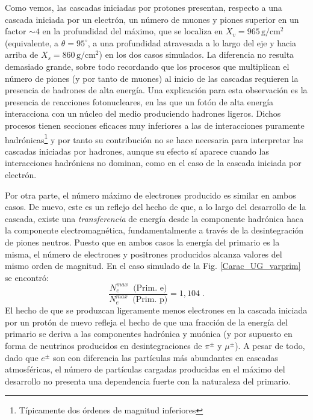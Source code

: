 \documentclass[11 pt, a4paper]{article} %
\numberwithin{equation}{section}
\numberwithin{figure}{section}
\numberwithin{table}{section}
\begin{document}
Como vemos, las cascadas iniciadas por protones presentan, respecto a una cascada iniciada por un electrón, un número de muones y piones superior en un factor $\sim 4$ en la profundidad del máximo, que se localiza en $X_v=965\,\mathrm{g/cm^2}$ (equivalente, a $\theta=95^\circ$, a una profundidad atravesada a lo largo del eje y hacia arriba de $X_s=860\,\mathrm{g/cm^2}$) en los dos casos simulados. La diferencia no resulta demasiado grande, sobre todo recordando que los procesos que multiplican el número de piones (y por tanto de muones) al inicio de las cascadas requieren la presencia de hadrones de alta energía. Una explicación para esta observación es la presencia de reacciones fotonucleares, en las que un fotón de alta energía interacciona con un núcleo del medio produciendo hadrones ligeros. Dichos procesos tienen secciones eficaces muy inferiores a las de interacciones puramente hadrónicas\footnote{Típicamente dos órdenes de magnitud inferiores} y por tanto su contribución no se hace necesaria para interpretar las cascadas iniciadas por hadrones, aunque su efecto sí aparece cuando las interacciones hadrónicas no dominan, como en el caso de la cascada iniciada por electrón. 

Por otra parte, el número máximo de electrones producido es similar en ambos casos. De nuevo, este es un reflejo del hecho de que, a lo largo del desarrollo de la cascada, existe una \textit{transferencia} de energía desde la componente hadrónica haca la componente electromagnética, fundamentalmente a través de la desintegración de piones neutros. Puesto que en ambos casos la energía del primario es la misma, el número de electrones y positrones producidos alcanza valores del mismo orden de magnitud. En el caso simulado de la Fig. \ref{Carac_UG_varprim} se encontró:
\begin{equation}
	\frac{N_e^{max}\;\;\text{(Prim. e)}}{N_e^{max}\;\;\text{(Prim. p)}}= 1,104\;. \label{ec26}
\end{equation}
El hecho de que se produzcan ligeramente menos electrones en la cascada iniciada por un protón de nuevo refleja el hecho de que una fracción de la energía del primario se deriva a las componentes hadrónica y muónica (y por supuesto en forma de neutrinos producidos en desintegraciones de $\pi^\pm$ y $\mu^\pm$). A pesar de todo, dado que $e^\pm$ son con diferencia las partículas más abundantes en cascadas atmosféricas, el número de partículas cargadas producidas en el máximo del desarrollo no presenta una dependencia fuerte con la naturaleza del primario.
\end{document}
